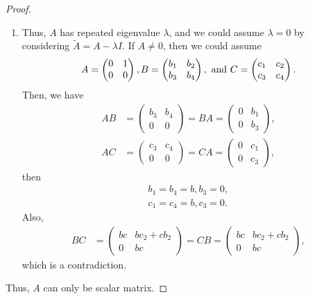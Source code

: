 \documentclass[11pt]{book}
\theoremstyle{definition}
\numberwithin{equation}{chapter}
\begin{document}
\begin{proof}
\begin{enumerate}[label=(\alph*)]
    \item Thus, $A$ has repeated eigenvalue $\lambda$, and we could assume $\lambda = 0$ by considering $\widetilde{A} = A - \lambda I$. If $A \neq 0$, then we could assume 
    \begin{align*}
        A = \begin{pmatrix}
            0 & 1 \\
            0 & 0
        \end{pmatrix}, B = \begin{pmatrix}
            b_1 & b_2 \\
            b_3 & b_4
        \end{pmatrix},\,\, {\rm and}\,\, C = \begin{pmatrix}
            c_1 & c_2 \\
            c_3 & c_4
        \end{pmatrix}.
    \end{align*}
    Then, we have
    \begin{align*}
        AB & = \begin{pmatrix}
            b_3 & b_4 \\
            0     & 0
        \end{pmatrix} = BA = \begin{pmatrix}
            0 & b_1 \\
            0 & b_3
        \end{pmatrix}, \\
        AC & = \begin{pmatrix}
            c_3 & c_4 \\
            0     & 0
        \end{pmatrix} = CA = \begin{pmatrix}
            0 & c_1 \\
            0 & c_3
        \end{pmatrix},
    \end{align*}
    then 
    \begin{align*}
        b_1 = b_4 = b, b_3 = 0, \\
        c_1 = c_4 = b, c_3 = 0.
    \end{align*}
    Also, 
    \begin{align*}
        BC & = \begin{pmatrix}
            bc & bc_2+cb_2 \\
            0     & bc
        \end{pmatrix} = CB = \begin{pmatrix}
            bc & bc_2+cb_2 \\
            0     & bc
        \end{pmatrix},
    \end{align*}
    which is a contradiction.
\end{enumerate}
Thus, $A$ can only be scalar matrix.
\end{proof}
\end{document}
